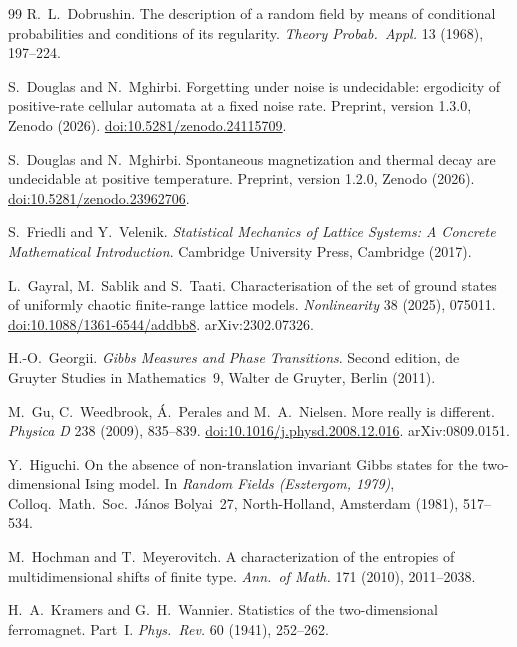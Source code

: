 \begin{thebibliography}{99}
 R.~L.~Dobrushin. The description of a random field by means of conditional probabilities and conditions of its regularity. \emph{Theory Probab.\ Appl.} 13 (1968), 197--224.

 S.~Douglas and N.~Mghirbi. Forgetting under noise is undecidable: ergodicity of positive-rate cellular automata at a fixed noise rate. Preprint, version 1.3.0, Zenodo (2026). \href{https://doi.org/10.5281/zenodo.24115709}{doi:10.5281/zenodo.24115709}.

 S.~Douglas and N.~Mghirbi. Spontaneous magnetization and thermal decay are undecidable at positive temperature. Preprint, version 1.2.0, Zenodo (2026). \href{https://doi.org/10.5281/zenodo.23962706}{doi:10.5281/\allowbreak zenodo.23962706}.

 S.~Friedli and Y.~Velenik. \emph{Statistical Mechanics of Lattice Systems: A Concrete Mathematical Introduction}. Cambridge University Press, Cambridge (2017).

 L.~Gayral, M.~Sablik and S.~Taati. Characterisation of the set of ground states of uniformly chaotic finite-range lattice models. \emph{Nonlinearity} 38 (2025), 075011. \href{https://doi.org/10.1088/1361-6544/addbb8}{doi:10.1088/1361-6544/addbb8}. arXiv:2302.07326.

 H.-O.~Georgii. \emph{Gibbs Measures and Phase Transitions}. Second edition, de Gruyter Studies in Mathematics~9, Walter de Gruyter, Berlin (2011).

 M.~Gu, C.~Weedbrook, \'A.~Perales and M.~A.~Nielsen. More really is different. \emph{Physica D} 238 (2009), 835--839. \href{https://doi.org/10.1016/j.physd.2008.12.016}{doi:10.1016/j.physd.2008.12.016}. arXiv:0809.0151.

 Y.~Higuchi. On the absence of non-translation invariant Gibbs states for the two-dimensional Ising model. In \emph{Random Fields (Esztergom, 1979)}, Colloq.\ Math.\ Soc.\ J\'anos Bolyai~27, North-Holland, Amsterdam (1981), 517--534.

 M.~Hochman and T.~Meyerovitch. A characterization of the entropies of multidimensional shifts of finite type. \emph{Ann.\ of Math.} 171 (2010), 2011--2038.

 H.~A.~Kramers and G.~H.~Wannier. Statistics of the two-dimensional ferromagnet. Part~I. \emph{Phys.\ Rev.} 60 (1941), 252--262.


\end{thebibliography}

